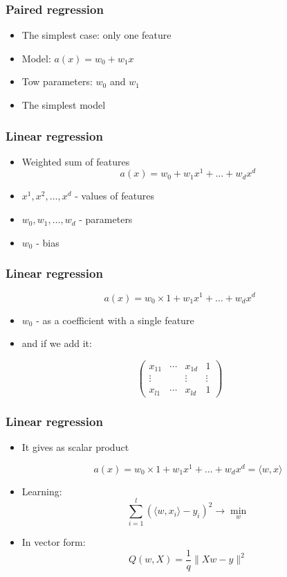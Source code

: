 \documentclass[default]{beamer}
\begin{document}
	\begin{frame}
		\frametitle{Paired regression}
		
		\begin{itemize}
			\item The simplest case: only one feature
			\item Model: $a(x)=w_0+w_1x$
			\item Tow parameters: $w_0$ and $w_1$
			\item The simplest model
		\end{itemize}
	\end{frame}

	\begin{frame}
		\frametitle{Linear regression}
		
		\begin{itemize}
			\item Weighted sum of features
			\[
				a(x)=w_0+w_1x^1+\dots + w_dx^d
			\]
			\item $x^1,x^2,\dots,x^d$ - values of features
			\item $w_0,w_1,\dots,w_d$ - parameters
			\item $w_0$ - bias
		\end{itemize}
	\end{frame}

	\begin{frame}
		\frametitle{Linear regression}
		\[
		a(x)=w_0\times 1+w_1x^1+\dots + w_dx^d
		\]
		\begin{itemize}
			\item $w_0$ - as a coefficient with a single feature
			
			\item and if we add it:
		\end{itemize}
	
		\[
			\begin{pmatrix}
			x_{11} & \cdots & x_{1d} & 1\\
			\vdots & & \vdots & \vdots \\
			x_{l1} & \cdots & x_{ld} & 1
			\end{pmatrix}
		\]
	\end{frame}

	\begin{frame}
		\frametitle{Linear regression}
		
		\Large 
		\begin{itemize}
			\item It gives as scalar product
			
			\[
			a(x)=w_0\times 1+w_1x^1+\dots + w_dx^d=\langle w,x\rangle
			\]
			\item Learning:
			\[
			\sum_{i=1}^{l}(\langle w, x_i\rangle-y_i)^2\rightarrow \min_w
			\]
			\item In vector form:
			\[
				Q(w,X)=\frac{1}{q}\|Xw-y\|^2
			\]
		\end{itemize}
	\end{frame}
\end{document}
